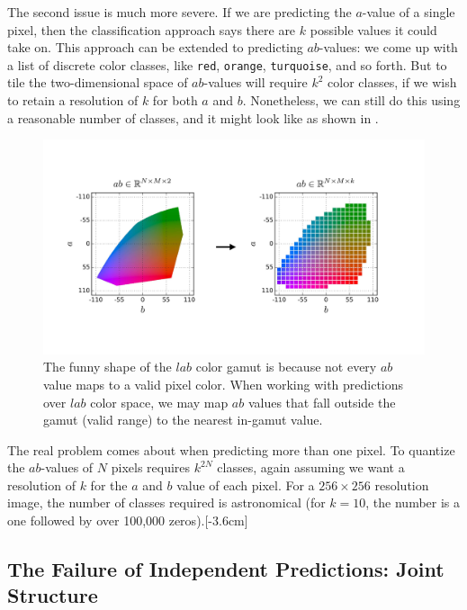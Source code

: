 The second issue is much more severe. If we are predicting the $a$-value of a single pixel, then the classification approach says there are $k$ possible values it could take on. This approach can be extended to predicting $ab$-values: we come up with a list of discrete color classes, like \texttt{red}, \texttt{orange}, \texttt{turquoise}, and so forth. But to tile the two-dimensional space of $ab$-values will require $k^2$ color classes, if we wish to retain a resolution of $k$ for both $a$ and $b$. Nonetheless, we can still do this using a reasonable number of classes, and it might look like as shown in \fig{\ref{fig:conditional_generative_models:color_quantization}}.
\begin{figure}[h!]
    \centerline{
    \includegraphics[width=0.8\linewidth]{./figures/conditional_generative_models/color_quantization.pdf}
    }
    \caption{The funny shape of the $lab$ color gamut is because not every $ab$ value maps to a valid pixel color. When working with predictions over $lab$ color space, we may map $ab$ values that fall outside the gamut (valid range) to the nearest in-gamut value.}
    \label{fig:conditional_generative_models:color_quantization}
\end{figure}

The real problem comes about when predicting more than one pixel. To quantize the $ab$-values of $N$ pixels requires $k^{2N}$ classes, again assuming we want a resolution of $k$ for the $a$ and $b$ value of each pixel. For a $256 \times 256$ resolution image, the number of classes required is astronomical (for $k=10$, the number is a one followed by over 100,000 zeros).[-3.6cm]

\subsection{The Failure of Independent Predictions: Joint Structure}

